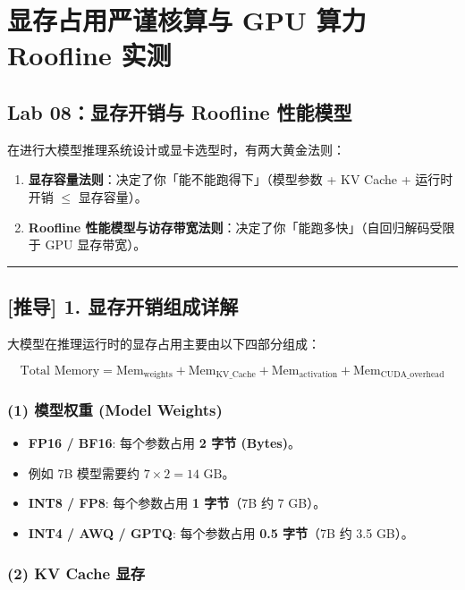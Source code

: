 \chapter{显存占用严谨核算与 GPU 算力 Roofline 实测}

\section{Lab 08：显存开销与 Roofline 性能模型}

在进行大模型推理系统设计或显卡选型时，有两大黄金法则：
\begin{enumerate}
  \item \textbf{显存容量法则}：决定了你「能不能跑得下」（模型参数 + KV Cache + 运行时开销 $\le$ 显存容量）。
  \item \textbf{Roofline 性能模型与访存带宽法则}：决定了你「能跑多快」（自回归解码受限于 GPU 显存带宽）。
\end{enumerate}

\vspace{0.8em}\hrule\vspace{0.8em}

\section{[推导] 1. 显存开销组成详解}

大模型在推理运行时的显存占用主要由以下四部分组成：

\[
\text{Total Memory} = \text{Mem}_{\text{weights}} + \text{Mem}_{\text{KV\_Cache}} + \text{Mem}_{\text{activation}} + \text{Mem}_{\text{CUDA\_overhead}}
\]

\subsection{(1) 模型权重 (Model Weights)}

\begin{itemize}
  \item \textbf{FP16 / BF16}: 每个参数占用 \textbf{2 字节 (Bytes)}。
  \item 例如 7B 模型需要约 $7 \times 2 = 14 \text{ GB}$。
  \item \textbf{INT8 / FP8}: 每个参数占用 \textbf{1 字节}（7B 约 7 GB）。
  \item \textbf{INT4 / AWQ / GPTQ}: 每个参数占用 \textbf{0.5 字节}（7B 约 3.5 GB）。
\end{itemize}

\subsection{(2) KV Cache 显存}

